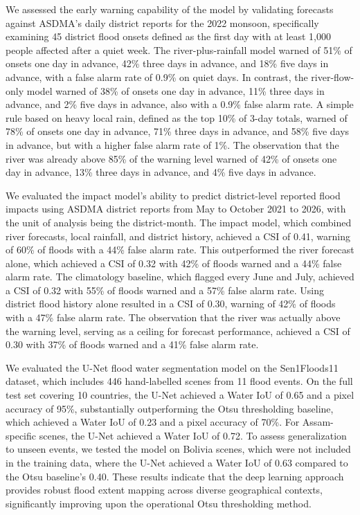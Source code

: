 \documentclass[conference]{IEEEtran}
\begin{document}
We assessed the early warning capability of the model by validating forecasts against ASDMA's daily district reports for the 2022 monsoon, specifically examining 45 district flood onsets defined as the first day with at least 1,000 people affected after a quiet week. The river-plus-rainfall model warned of 51\% of onsets one day in advance, 42\% three days in advance, and 18\% five days in advance, with a false alarm rate of 0.9\% on quiet days. In contrast, the river-flow-only model warned of 38\% of onsets one day in advance, 11\% three days in advance, and 2\% five days in advance, also with a 0.9\% false alarm rate. A simple rule based on heavy local rain, defined as the top 10\% of 3-day totals, warned of 78\% of onsets one day in advance, 71\% three days in advance, and 58\% five days in advance, but with a higher false alarm rate of 1\%. The observation that the river was already above 85\% of the warning level warned of 42\% of onsets one day in advance, 13\% three days in advance, and 4\% five days in advance.

We evaluated the impact model's ability to predict district-level reported flood impacts using ASDMA district reports from May to October 2021 to 2026, with the unit of analysis being the district-month. The impact model, which combined river forecasts, local rainfall, and district history, achieved a CSI of 0.41, warning of 60\% of floods with a 44\% false alarm rate. This outperformed the river forecast alone, which achieved a CSI of 0.32 with 42\% of floods warned and a 44\% false alarm rate. The climatology baseline, which flagged every June and July, achieved a CSI of 0.32 with 55\% of floods warned and a 57\% false alarm rate. Using district flood history alone resulted in a CSI of 0.30, warning of 42\% of floods with a 47\% false alarm rate. The observation that the river was actually above the warning level, serving as a ceiling for forecast performance, achieved a CSI of 0.30 with 37\% of floods warned and a 41\% false alarm rate.

We evaluated the U-Net flood water segmentation model on the Sen1Floods11 dataset, which includes 446 hand-labelled scenes from 11 flood events. On the full test set covering 10 countries, the U-Net achieved a Water IoU of 0.65 and a pixel accuracy of 95\%, substantially outperforming the Otsu thresholding baseline, which achieved a Water IoU of 0.23 and a pixel accuracy of 70\%. For Assam-specific scenes, the U-Net achieved a Water IoU of 0.72. To assess generalization to unseen events, we tested the model on Bolivia scenes, which were not included in the training data, where the U-Net achieved a Water IoU of 0.63 compared to the Otsu baseline's 0.40. These results indicate that the deep learning approach provides robust flood extent mapping across diverse geographical contexts, significantly improving upon the operational Otsu thresholding method.
\end{document}
